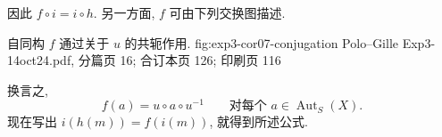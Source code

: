 因此 \(f\circ i=i\circ h\). 另一方面, \(f\) 可由下列交换图描述.

  {自同构 \(f\) 通过关于 \(u\) 的共轭作用.}
  {fig:exp3-cor07-conjugation}
  {Polo--Gille Exp3-14oct24.pdf, 分篇页 16; 合订本页 126; 印刷页 116}

换言之,
\[
 f(a)=u\circ a\circ u^{-1}
 \qquad\text{对每个 }a\in\operatorname{Aut}_S(X).
\]
现在写出 \(i(h(m))=f(i(m))\), 就得到所述公式.

